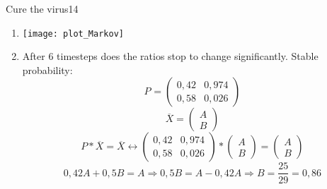 \begin{questions}
\begin{question}{Cure the virus}{14}
\begin{answer}
\begin{enumerate}
\begin{equation}
\begin{pmatrix}
\end{pmatrix} = \begin{pmatrix}
0,42 & 0,974\\
0,58 & 0,026

\end{pmatrix} * \begin{pmatrix}
0,42 \\
0,58

\end{pmatrix} 
		\end{equation}
		
		\item 
		\texttt{[image: plot\_Markov]}\\
		\item
		After 6 timesteps does the ratios stop to change significantly. Stable probability:
		\begin{equation}
								P_{} = 
\begin{pmatrix}
0,42 & 0,974\\
0,58 & 0,026

\end{pmatrix}
		\end{equation}
				\begin{equation}
								\overline{X} = 
\begin{pmatrix}
A\\
B

\end{pmatrix}
		\end{equation}
						\begin{equation}
								P* \overline{X} = \overline{X} \leftrightarrow \begin{pmatrix}
0,42 & 0,974\\
0,58 & 0,026

\end{pmatrix} * \begin{pmatrix}
A\\
B

\end{pmatrix} = \begin{pmatrix}
A\\
B

\end{pmatrix}
		\end{equation}
		\begin{equation}
		0,42 A + 0,5B = A \Rightarrow 0,5B = A - 0,42A 
		\Rightarrow B = \frac{ 25 }{ 29 } = 0,86
		\end{equation}
		

\end{enumerate}
\end{answer}
\end{question}
\end{questions}
